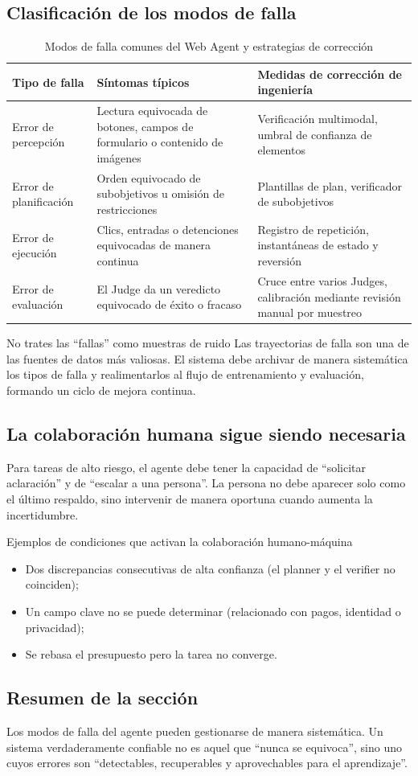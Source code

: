 \subsection{Clasificación de los modos de falla}
\begin{table}[H]
\centering
\small
\begin{tabular}{p{2.7cm}p{3.8cm}p{4.2cm}}
\toprule
\textbf{Tipo de falla} & \textbf{Síntomas típicos} & \textbf{Medidas de corrección de ingeniería} \\
\midrule
Error de percepción & Lectura equivocada de botones, campos de formulario o contenido de imágenes & Verificación multimodal, umbral de confianza de elementos \\
Error de planificación & Orden equivocado de subobjetivos u omisión de restricciones & Plantillas de plan, verificador de subobjetivos \\
Error de ejecución & Clics, entradas o detenciones equivocadas de manera continua & Registro de repetición, instantáneas de estado y reversión \\
Error de evaluación & El Judge da un veredicto equivocado de éxito o fracaso & Cruce entre varios Judges, calibración mediante revisión manual por muestreo \\
\bottomrule
\end{tabular}
\caption{Modos de falla comunes del Web Agent y estrategias de corrección}
\end{table}

\begin{warningbox}{No trates las ``fallas'' como muestras de ruido}
Las trayectorias de falla son una de las fuentes de datos más valiosas. El sistema debe archivar de manera sistemática los tipos de falla y realimentarlos al flujo de entrenamiento y evaluación, formando un ciclo de mejora continua.
\end{warningbox}

\subsection{La colaboración humana sigue siendo necesaria}
Para tareas de alto riesgo, el agente debe tener la capacidad de ``solicitar aclaración'' y de ``escalar a una persona''. La persona no debe aparecer solo como el último respaldo, sino intervenir de manera oportuna cuando aumenta la incertidumbre.

\begin{knowledgebox}{Ejemplos de condiciones que activan la colaboración humano-máquina}
\begin{itemize}
    \item Dos discrepancias consecutivas de alta confianza (el planner y el verifier no coinciden);
    \item Un campo clave no se puede determinar (relacionado con pagos, identidad o privacidad);
    \item Se rebasa el presupuesto pero la tarea no converge.
\end{itemize}
\end{knowledgebox}

\subsection{Resumen de la sección}
Los modos de falla del agente pueden gestionarse de manera sistemática. Un sistema verdaderamente confiable no es aquel que ``nunca se equivoca'', sino uno cuyos errores son ``detectables, recuperables y aprovechables para el aprendizaje''.

